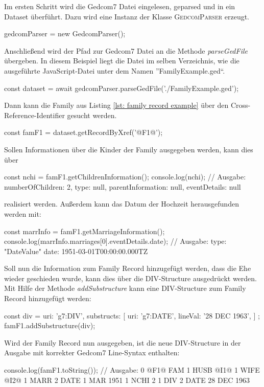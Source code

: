 \vspace{1em}
{
\noindent
Im ersten Schritt wird die Gedcom7 Datei eingelesen, geparsed und in ein Dataset überführt. Dazu wird eine Instanz der Klasse \textsc{GedcomParser} erzeugt.
\begin{javascriptNoCaption}
	gedcomParser = new GedcomParser();
\end{javascriptNoCaption}
Anschließend wird der Pfad zur Gedcom7 Datei an die Methode \textit{parseGedFile} übergeben. In diesem Beispiel liegt die Datei im selben Verzeichnis, wie die ausgeführte JavaScript-Datei unter dem Namen ''FamilyExample.ged``. 
\begin{javascriptNoCaption}
	const dataset = await gedcomParser.parseGedFile('./FamilyExample.ged');
\end{javascriptNoCaption}
Dann kann die Family aus Listing \ref{lst: family record example} über den Cross-Reference-Identifier gesucht werden.
\begin{javascriptNoCaption}
	const famF1 = dataset.getRecordByXref('@F1@');
\end{javascriptNoCaption}
Sollen Informationen über die Kinder der Family ausgegeben werden, kann dies über 
\begin{javascriptNoCaption}
	const nchi = famF1.getChildrenInformation();
	console.log(nchi);
	// Ausgabe: 
	   {
		 numberOfChildren: 2,
		 type: null,
		 parentInformation: null,
		 eventDetails: null
	   }
\end{javascriptNoCaption}
realisiert werden. Außerdem kann das Datum der Hochzeit herausgefunden werden mit:
\begin{javascriptNoCaption}
	const marrInfo = famF1.getMarriageInformation();
	console.log(marrInfo.marriages[0].eventDetails.date);
	// Ausgabe: 
	   {
		 type: "DateValue"
		 date: 1951-03-01T00:00:00.000TZ
	   }
\end{javascriptNoCaption}
Soll nun die Information zum Family Record hinzugefügt werden, dass die Ehe wieder geschieden wurde, kann dies über die DIV-Structure ausgedrückt werden. Mit Hilfe der Methode \textit{addSubstructure} kann eine DIV-Structure zum Family Record hinzugefügt werden:
\begin{javascriptNoCaption}
	const div = {
		uri: 'g7:DIV',
		substructs: [{
			uri: 'g7:DATE',
			lineVal: '28 DEC 1963',
		}]
	};
	famF1.addSubstructure(div);
\end{javascriptNoCaption}
Wird der Family Record nun ausgegeben, ist die neue DIV-Structure in der Ausgabe mit korrekter Gedcom7 Line-Syntax enthalten:
\begin{javascriptNoCaption}
	console.log(famF1.toString());
	// Ausgabe: 
	   0 @F1@ FAM
	   1 HUSB @I1@
	   1 WIFE @I2@
	   1 MARR
	   2 DATE 1 MAR 1951
	   1 NCHI 2
	   1 DIV
	   2 DATE 28 DEC 1963
\end{javascriptNoCaption}
}

